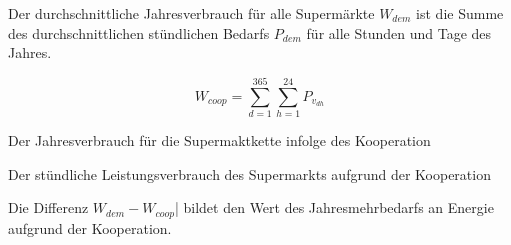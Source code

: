 Der durchschnittliche Jahresverbrauch f\"ur alle Superm\"arkte $W_{dem}$ ist die
Summe des durchschnittlichen st\"undlichen Bedarfs $P_{dem}$ f\"ur alle Stunden
und Tage des Jahres.

\begin{equation}
W_{coop} = \sum^{365}_{d=1}\sum^{24}_{h=1}P_{v_{dh}}
\label{eq:wcoop}
\end{equation}

\begin{description}[\dth]
\item[$W_{coop}$] Der Jahresverbrauch f\"ur die Supermaktkette infolge des
Kooperation
\item[$P_{v}$] Der st\"undliche Leistungsverbrauch des Supermarkts aufgrund der
Kooperation
\end{description}

Die Differenz $W_{dem}- W_{coop}$| bildet den Wert des Jahresmehrbedarfs an
Energie aufgrund der Kooperation.

